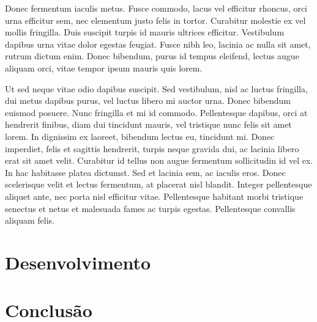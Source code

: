 \documentclass{article}
\begin{document}
Donec fermentum iaculis metus. Fusce commodo, lacus vel efficitur rhoncus, orci urna efficitur sem, nec elementum justo felis in tortor. Curabitur molestie ex vel mollis fringilla. Duis suscipit turpis id mauris ultrices efficitur. Vestibulum dapibus urna vitae dolor egestas feugiat. Fusce nibh leo, lacinia ac nulla sit amet, rutrum dictum enim. Donec bibendum, purus id tempus eleifend, lectus augue aliquam orci, vitae tempor ipsum mauris quis lorem.

Ut sed neque vitae odio dapibus suscipit. Sed vestibulum, nisl ac luctus fringilla, dui metus dapibus purus, vel luctus libero mi auctor urna. Donec bibendum euismod posuere. Nunc fringilla et mi id commodo. Pellentesque dapibus, orci at hendrerit finibus, diam dui tincidunt mauris, vel tristique nunc felis sit amet lorem. In dignissim ex laoreet, bibendum lectus eu, tincidunt mi. Donec imperdiet, felis et sagittis hendrerit, turpis neque gravida dui, ac lacinia libero erat sit amet velit. Curabitur id tellus non augue fermentum sollicitudin id vel ex. In hac habitasse platea dictumst. Sed et lacinia sem, ac iaculis eros. Donec scelerisque velit et lectus fermentum, at placerat nisl blandit. Integer pellentesque aliquet ante, nec porta nisl efficitur vitae. Pellentesque habitant morbi tristique senectus et netus et malesuada fames ac turpis egestas. Pellentesque convallis aliquam felis.

\section{Desenvolvimento}

\section{Conclusão}
\end{document}
